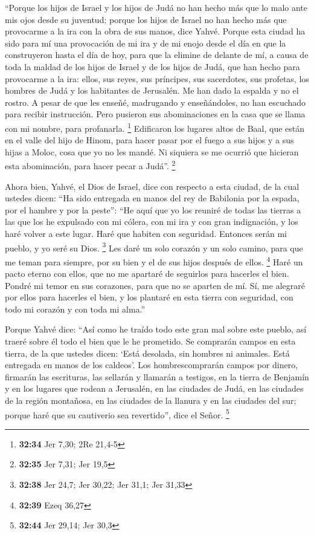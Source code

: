 \begin{paracol}{2}
 ``Porque los hijos de Israel y los hijos de Judá no han
hecho más que lo malo ante mis ojos desde su juventud; porque los hijos
de Israel no han hecho más que provocarme a la ira con la obra de sus
manos, dice Yahvé.  Porque esta ciudad ha sido para mí
una provocación de mi ira y de mi enojo desde el día en que la
construyeron hasta el día de hoy, para que la elimine de delante de mí,
 a causa de toda la maldad de los hijos de Israel y de
los hijos de Judá, que han hecho para provocarme a la ira: ellos, sus
reyes, sus príncipes, sus sacerdotes, sus profetas, los hombres de Judá
y los habitantes de Jerusalén.  Me han dado la espalda y
no el rostro. A pesar de que les enseñé, madrugando y enseñándoles, no
han escuchado para recibir instrucción.  Pero pusieron
sus abominaciones en la casa que se llama con mi nombre, para
profanarla. \footnote{\textbf{32:34} Jer 7,30; 2Re 21,4-5}
 Edificaron los lugares altos de Baal, que están en el
valle del hijo de Hinom, para hacer pasar por el fuego a sus hijos y a
sus hijas a Moloc, cosa que yo no les mandé. Ni siquiera se me ocurrió
que hicieran esta abominación, para hacer pecar a Judá''. \footnote{\textbf{32:35}
  Jer 7,31; Jer 19,5}

 Ahora bien, Yahvé, el Dios de Israel, dice con respecto
a esta ciudad, de la cual ustedes dicen: ``Ha sido entregada en manos
del rey de Babilonia por la espada, por el hambre y por la peste'':
 ``He aquí que yo los reuniré de todas las tierras a las
que los he expulsado con mi cólera, con mi ira y con gran indignación, y
los haré volver a este lugar. Haré que habiten con seguridad.
 Entonces serán mi pueblo, y yo seré su Dios. \footnote{\textbf{32:38}
  Jer 24,7; Jer 30,22; Jer 31,1; Jer 31,33}  Les daré un
solo corazón y un solo camino, para que me teman para siempre, por su
bien y el de sus hijos después de ellos. \footnote{\textbf{32:39} Ezeq
  36,27}  Haré un pacto eterno con ellos, que no me
apartaré de seguirlos para hacerles el bien. Pondré mi temor en sus
corazones, para que no se aparten de mí.  Sí, me alegraré
por ellos para hacerles el bien, y los plantaré en esta tierra con
seguridad, con todo mi corazón y con toda mi alma.''

 Porque Yahvé dice: ``Así como he traído todo este gran
mal sobre este pueblo, así traeré sobre él todo el bien que le he
prometido.  Se comprarán campos en esta tierra, de la que
ustedes dicen: `Está desolada, sin hombres ni animales. Está entregada
en manos de los caldeos'.  Los hombrescomprarán campos
por dinero, firmarán las escrituras, las sellarán y llamarán a testigos,
en la tierra de Benjamín y en los lugares que rodean a Jerusalén, en las
ciudades de Judá, en las ciudades de la región montañosa, en las
ciudades de la llanura y en las ciudades del sur; porque haré que su
cautiverio sea revertido'', dice el Señor. \footnote{\textbf{32:44} Jer
  29,14; Jer 30,3}


\end{paracol}
